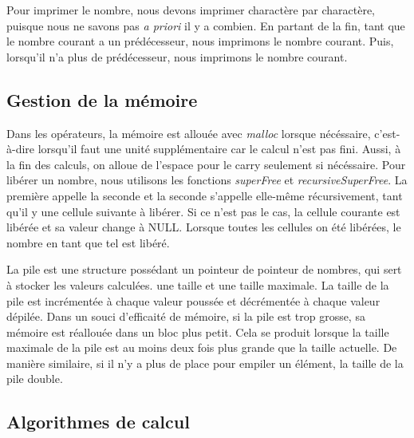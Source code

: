 \documentclass[letterpaper,12pt]{scrartcl}
\begin{document}
        Pour imprimer le nombre, nous devons imprimer charactère par charactère, puisque nous ne savons pas \textit{a priori} il y a combien. En partant de la fin, tant que le nombre courant a un prédécesseur, nous imprimons le nombre courant. Puis, lorsqu'il n'a plus de prédécesseur, nous imprimons le nombre courant. 

        \subsection{Gestion de la mémoire}
        Dans les opérateurs, la mémoire est allouée avec \textit{malloc} lorsque nécéssaire, c'est-à-dire lorsqu'il faut une unité supplémentaire car le calcul n'est pas fini. Aussi, à la fin des calculs, on alloue de l'espace pour le carry seulement si nécéssaire. Pour libérer un nombre, nous utilisons les fonctions \textit{superFree} et \textit{recursiveSuperFree}. La première appelle la seconde et la seconde s'appelle elle-même récursivement, tant qu'il y une cellule suivante à libérer. Si ce n'est pas le cas, la cellule courante est libérée et sa valeur change à NULL. Lorsque toutes les cellules on été libérées, le nombre en tant que tel est libéré.
         
        La pile est une structure possédant un pointeur de pointeur de nombres, qui sert à stocker les valeurs calculées. une taille et une taille maximale. La taille de la pile est incrémentée à chaque valeur poussée et décrémentée à chaque valeur dépilée. Dans un souci d'efficaité de mémoire, si la pile est trop grosse, sa mémoire est réallouée dans un bloc plus petit.  Cela se produit lorsque la taille maximale de la pile est au moins deux fois plus grande que la taille actuelle. De manière similaire, si il n'y a plus de place pour empiler un élément, la taille de la pile double. 
        
        \subsection{Algorithmes de calcul} \label{algos}
            
        
\end{document}
